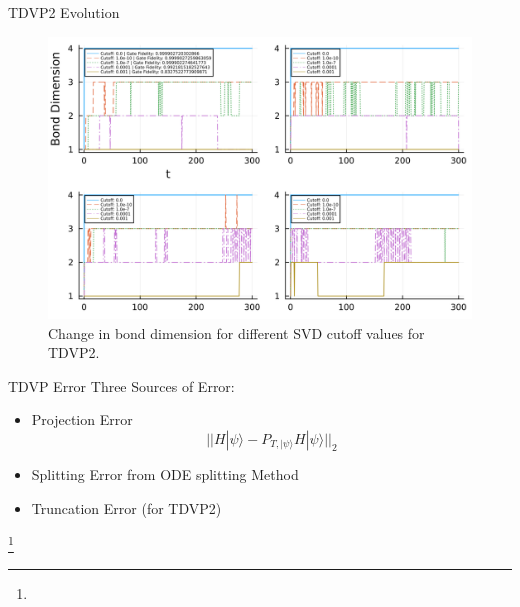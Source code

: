 \documentclass{beamer}
\newcommand\blfootnote[1]{%
  \begingroup
  \renewcommand\thefootnote{}\footnote{#1}%
  \addtocounter{footnote}{-1}%
  \endgroup
}
\begin{document}
\begin{frame}{TDVP2 Evolution}
    \fontsize{10pt}{7.2pt}\selectfont 
    \begin{figure}
        \centering
        \includegraphics[width=0.95\linewidth]{images/TDVP2 Tensor Diagram/bd_plot.png}
        \caption{Change in bond dimension for different SVD cutoff values for TDVP2.}
        \label{fig:TDVP2_BondDimension}
    \end{figure}
\end{frame}

\begin{frame}{TDVP Error}
    Three Sources of Error: 
    \begin{itemize}
        \item Projection Error \begin{equation*}
            ||H|\psi\rangle - P_{T, |\psi\rangle}H|\psi\rangle||_2
        \end{equation*}
        \item Splitting Error from ODE splitting Method
        \item Truncation Error (for TDVP2) 
    \end{itemize}
    \blfootnote{}
\end{frame}

\end{document}
